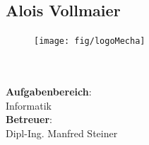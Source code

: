 \subsection*{Alois Vollmaier}
\begin{figure}
\begin{center}
  \texttt{[image: fig/logoMecha]}
\end{center}
\end{figure}
\mbox{}\\
\mbox{}\\
\textbf{Aufgabenbereich}:\\
Informatik\\
\textbf{Betreuer}:\\
Dipl-Ing. Manfred Steiner
\mbox{}\\
\mbox{}\\
\mbox{}\\
\mbox{}\\
\mbox{}\\
\mbox{}\\